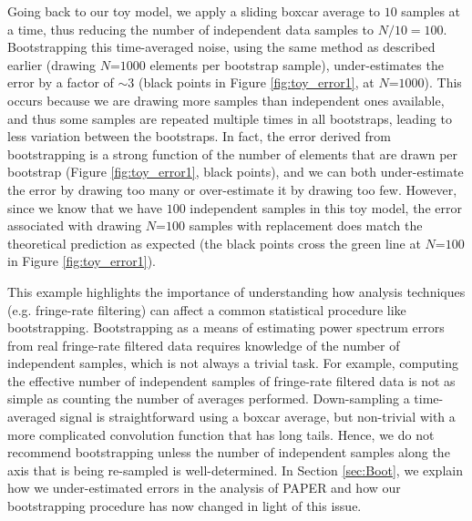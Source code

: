 \documentclass[preprint2,numberedappendix,tighten]{aastex6}  %
\begin{document}
Going back to our toy model, we apply a sliding boxcar average to $10$ samples at a time, thus reducing the number of 
independent data samples to $N/10 = 100$. Bootstrapping this time-averaged noise, using the same method as described 
earlier (drawing $N$=$1000$ elements per bootstrap sample), under-estimates the error by a factor of $\sim3$ (black points in Figure \ref{fig:toy_error1}, at $N$=$1000$). This occurs 
because we are drawing more samples than independent ones available, and thus some samples are repeated multiple times 
in all bootstraps, leading to less variation between the bootstraps. In fact, the error derived from bootstrapping is a strong 
function of the number of elements that are drawn per bootstrap (Figure \ref{fig:toy_error1}, black points), and we can both 
under-estimate the error by drawing too many or over-estimate it by drawing too few. However, since we know that we have $100$ 
independent samples in this toy model, the error associated with drawing $N$=$100$ samples with replacement does match the theoretical prediction 
as expected (the black points cross the green line at $N$=$100$ in Figure \ref{fig:toy_error1}).

This example highlights the importance of understanding how analysis techniques (e.g. fringe-rate filtering) can affect a 
common statistical procedure like bootstrapping. Bootstrapping as a means of estimating power spectrum errors from real 
fringe-rate filtered data requires knowledge of the number of independent samples, which is not always a trivial task. For 
example, computing the effective number of independent samples of fringe-rate filtered data is not as simple as counting the 
number of averages performed. Down-sampling a time-averaged signal is straightforward using a boxcar average, but non-trivial with a more complicated convolution function that has long tails. Hence, we do not recommend bootstrapping unless the 
number of independent samples along the axis that is being re-sampled is well-determined. In Section \ref{sec:Boot}, we explain how we under-estimated errors in the  analysis of PAPER and how our bootstrapping procedure has now changed in light of this issue. 
\end{document}
